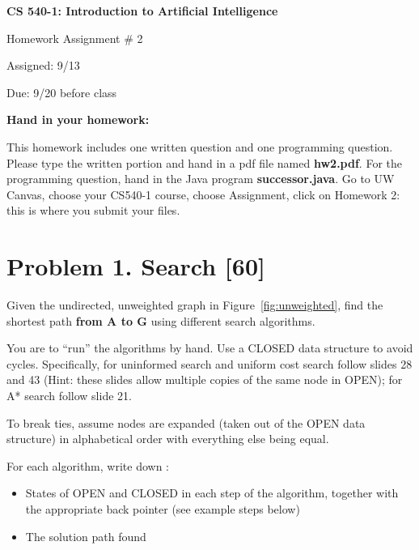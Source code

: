 \documentclass[10pt,a4paper]{article}
\begin{document}
\begin{center}
{\bf \large CS 540-1: Introduction to Artificial Intelligence

Homework Assignment \# 2

\vspace{0.5cm}

Assigned:  9/13 

Due:  9/20 before class} 
\end{center}

\vspace{1cm}

\begin{center}
{\bf \Large Hand in your homework:}
\end{center}
This homework includes one written question and one programming question. Please type the written portion and hand in a pdf file named \textbf{hw2.pdf}. For the programming question, hand in the Java program \textbf{successor.java}. 
Go to UW Canvas, choose your CS540-1 course, choose Assignment, click on Homework 2: this is where you submit your files.




\section*{Problem 1. Search [60]}


Given the undirected, unweighted graph in Figure~\ref{fig:unweighted}, find the shortest path \textbf{from A to G} using different search algorithms. 

You are to ``run'' the algorithms by hand.  Use a CLOSED data structure to avoid cycles. Specifically, for uninformed search and uniform cost search follow slides 28 and 43 (Hint: these slides allow multiple copies of the same node in OPEN); for A* search follow slide 21. 

To break ties, assume nodes are expanded (taken out of the OPEN data structure) in alphabetical order with everything else being equal. 


For each algorithm, write down :
\vspace{-2mm}
\begin{itemize}
 \setlength{\topsep}{0pt}
 \setlength{\itemsep}{0pt}
 \setlength{\parskip}{0pt}
 \setlength{\parsep}{0pt}
 \item States of OPEN and CLOSED in each step of the algorithm, together with the appropriate back pointer (see example steps below)
 \item The solution path found
\end{itemize}
\end{document}
